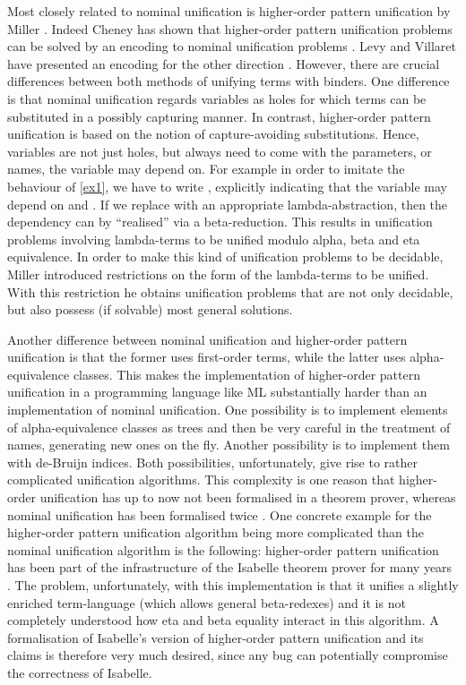 \begin{isabellebody}
\begin{isamarkuptext}
  Most closely related to nominal unification is higher-order pattern unification by 
  Miller \cite{Miller91}. Indeed Cheney has shown that higher-order pattern unification problems
  can be solved by an encoding to nominal unification problems \cite{cheney05}. Levy and Villaret 
  have  presented an encoding for the other direction \cite{levyvillaret08}. However, there are 
  crucial differences between both methods of unifying terms with binders. One difference is that 
  nominal unification regards variables as holes for which terms can be 
  substituted in a possibly
  capturing manner. In contrast, higher-order pattern unification is based on the notion of 
  capture-avoiding substitutions. Hence, variables are not just holes, but always need to come 
  with the parameters, or names, the variable 
  may depend on. For example in order to imitate the behaviour of \eqref{ex1}, we have to
  write , explicitly indicating that the variable  may depend 
  on  and . If we replace  with an appropriate lambda-abstraction, then 
  the dependency can by ``realised'' via a beta-reduction.
  This results in unification problems involving lambda-terms to be unified
  modulo alpha, beta and eta equivalence. In order to make this kind of unification 
  problems to be decidable, Miller introduced restrictions on the form of the lambda-terms to be unified. 
  With this restriction he obtains unification problems that are not only decidable, but 
  also possess (if solvable) most general solutions.
  
  Another difference between nominal unification and higher-order pattern unification is that the 
  former uses first-order terms, while the latter uses alpha-equivalence classes. This makes the
  implementation of higher-order pattern unification in a programming language
  like ML substantially harder than an implementation of nominal
  unification. One possibility is to implement elements of alpha-equivalence classes as 
  trees and then be very careful in the treatment
  of names, generating new ones on the fly. Another 
  possibility is to implement them with 
  de-Bruijn indices. Both possibilities, unfortunately,
  give rise to rather complicated unification algorithms. This 
  complexity is one reason that higher-order
  unification has up to now not been formalised in a theorem prover, whereas nominal
  unification has been formalised twice \cite{UrbanPittsGabbay04, KumarNorrish10}. 
  One concrete example for the higher-order
  pattern unification algorithm being more complicated than the 
  nominal unification algorithm is the following: higher-order 
  pattern unification has been part of the infrastructure of the 
  Isabelle theorem prover for many years
  \cite{Nipkow93}. The problem, unfortunately,  with this implementation is that it unifies 
  a slightly enriched term-language (which allows general beta-redexes) and it is not completely
  understood how eta and beta equality interact in this algorithm. A formalisation
  of Isabelle's version of higher-order pattern unification and its claims is 
  therefore very
  much desired, since any bug can potentially compromise
  the correctness of Isabelle.


\end{isamarkuptext}
\end{isabellebody}
